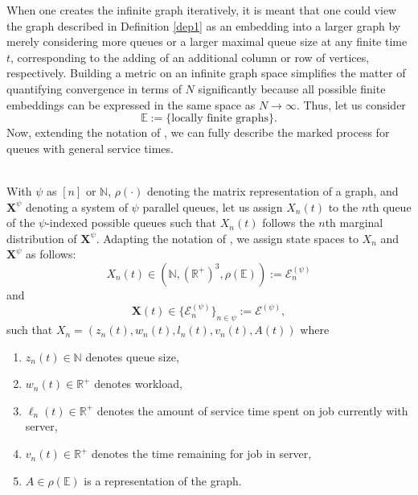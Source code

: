When one creates the infinite graph iteratively, it is meant that one could view the graph described in Definition \ref{dep1} as an embedding into a larger graph by merely considering more queues or a larger maximal queue size at any finite time $t$, corresponding to the adding of an additional column or row of vertices, respectively. Building a metric on an infinite graph space simplifies the matter of quantifying convergence in terms of $N$ significantly because all possible finite embeddings can be expressed in the same space as $N\rightarrow \infty$. Thus, let us consider \[\mathbb{E}:= \{\text{locally finite graphs}\}.\] Now, extending the notation of \cite{bramson_asymptotic_2012}, we can fully describe the marked process for queues with general service times.
\begin{definition}
    \hfill \\
    With $\psi$ as $[n]$ or $\mathbb{N}$, $\rho(\cdot)$ denoting the matrix representation of a graph, and $\mathbf{X}^{\psi}$ denoting a system of $\psi$ parallel queues,
    let us assign $X_{n}(t)$ to the $n$th queue of the $\psi$-indexed possible queues such that $X_{n}(t)$ follows the $n$th marginal distribution of $\mathbf{X}^{\psi}$.
    Adapting the notation of \cite{bramson_asymptotic_2012}, we assign state spaces to $X_{n}$ and $\mathbf{X}^{\psi}$ as follows:
        \[X_{n}(t)\in (\mathbb{N},\left(\mathbb{R}^{+}\right)^{3},\rho(\mathbb{E})):=\mathcal{E}^{(\psi)}_{n}\]
    and
        \[\mathbf{X}(t) \in \{\mathcal{E}^{(\psi)}_{n}\}_{n \in \psi} := \mathcal{E}^{(\psi)},\]
    such that $X_{n} = (z_{n}(t), w_{n}(t),l_{n}(t),v_{n}(t),A(t))$ where
    \begin{enumerate}
        \item $z_{n}(t) \in \mathbb{N}$ denotes queue size,
        \item $ w_{n}(t) \in \mathbb{R}^{+}$ denotes workload,
        \item $\ell_{n}(t) \in \mathbb{R}^{+}$ denotes the amount of service time spent on job currently with server,
        \item $v_{n}(t) \in \mathbb{R}^{+}$ denotes the time remaining for job in server,
        \item $A \in \rho(\mathbb{E})$ is a representation of the graph.
    \end{enumerate}
    \label{def:spec}
\end{definition}


